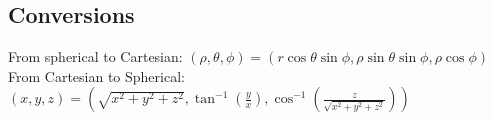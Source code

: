 \subsection{Conversions}
\noindent
From spherical to Cartesian: $(\rho,\theta,\phi)=(r\cos{\theta}\sin{\phi},\rho\sin{\theta}\sin{\phi},\rho\cos{\phi})$\\
From Cartesian to Spherical: $(x,y,z)=\left(\sqrt{x^2+y^2+z^2},\tan^{-1}{\left(\frac{y}{x}\right)},\cos^{-1}{\left(\frac{z}{\sqrt{x^2+y^2+z^2}}\right)}\right)$\\
